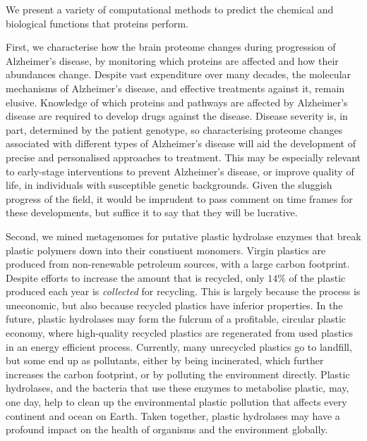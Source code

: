\cleardoublepage

\begin{impactstatement}
We present a variety of computational methods to predict the chemical and biological functions that proteins perform.

First, we characterise how the brain proteome changes during progression of Alzheimer's disease, by monitoring which proteins are affected and how their abundances change.
Despite vast expenditure over many decades, the molecular mechanisms of Alzheimer's disease, and effective treatments against it, remain elusive.
Knowledge of which proteins and pathways are affected by Alzheimer's disease are required to develop drugs against the disease.
Disease severity is, in part, determined by the patient genotype, so characterising proteome changes associated with different types of Alzheimer’s disease will aid the development of precise and personalised approaches to treatment.
This may be especially relevant to early-stage interventions to prevent Alzheimer’s disease, or improve quality of life, in individuals with susceptible genetic backgrounds.
Given the sluggish progress of the field, it would be imprudent to pass comment on time frames for these developments, but suffice it to say that they will be lucrative.

Second, we mined metagenomes for putative plastic hydrolase enzymes that break plastic polymers down into their constiuent monomers.
Virgin plastics are produced from non-renewable petroleum sources, with a large carbon footprint.
Despite efforts to increase the amount that is recycled, only $14\%$ of the plastic produced each year is \emph{collected} for recycling.
This is largely because the process is uneconomic, but also because recycled plastics have inferior properties.
In the future, plastic hydrolases may form the fulcrum of a profitable, circular plastic economy, where high-quality recycled plastics are regenerated from used plastics in an energy efficient process.
Currently, many unrecycled plastics go to landfill, but some end up as pollutants, either by being incinerated, which further increases the carbon footprint, or by polluting the environment directly.
Plastic hydrolases, and the bacteria that use these enzymes to metabolise plastic, may, one day, help to clean up the environmental plastic pollution that affects every continent and ocean on Earth.
Taken together, plastic hydrolases may have a profound impact on the health of organisms and the environment globally.


\end{impactstatement}
